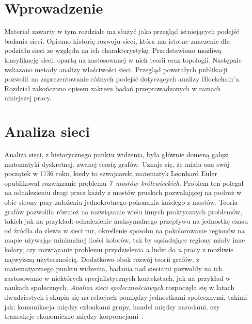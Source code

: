 \documentclass[12pt, oneside, final, openany]{mgr}
\begin{document}
\section{Wprowadzenie}

\indent Materiał zawarty w tym rozdziale ma służyć jako przegląd istniejących podejść badania sieci. Opisano historię rozwoju sieci, która ma istotne znaczenie dla podziału sieci ze względu na ich charakterystykę. Przedstawiono możliwą klasyfikację sieci, opartą na zastosowanej w nich teorii oraz topologii. Następnie wskazano metody analizy właściwości sieci. Przegląd powstałych publikacji pozwolił na zaprezentowanie różnych podejść dotyczących analizy Blockchain'a. Rozdział zakończono opisem zakresu badań przeprowadzonych w ramach niniejszej pracy.

\section{Analiza sieci}

\indent Analiza sieci, z historycznego punktu widzenia, była głównie domeną gałęzi matematyki dyskretnej, zwanej teorią grafów. Uznaje się, że miała ona swój początek w 1736 roku, kiedy to szwajcarski matematyk Leonhard Euler opublikował rozwiązanie problemu \textit{7~mostów~królewieckich}. Problem ten polegał na odnalezieniu drogi przez każdy z mostów pruskich pozwalającej na podroż w obie strony przy założeniu jednokrotnego pokonania każdego z mostów. Teoria grafów pozwoliła również na rozwiązanie wielu innych praktycznych problemów, takich jak na przykład: odnalezienie maksymalnego przepływu na jednostkę czasu od źródła do zlewu w sieci rur, określenie sposobu na pokolorowanie regionów na mapie używając minimalnej ilości kolorów, tak by sąsiadujące regiony miały inne kolory, czy rozwiązanie problemu przydzielenia \textit{n} ludzi do \textit{n} pracy  z możliwie najwyższą użytecznością. Dodatkowo obok rozwój teorii grafów, z matematycznego punktu widzenia, badania nad sieciami pozwoliły na ich zastosowanie w niektórych specjalistycznych kontekstach, jak na przykład w naukach społecznych. \textit{Analiza sieci społecznościowych} rozpoczęła się w latach dwudziestych i skupia się na relacjach pomiędzy jednostkami społecznymi, takimi jak: komunikacja między członkami grupy, handel między narodami, czy transakcje ekonomiczne między korporacjami~\cite{BOCCALETTI2006175}.
\end{document}
